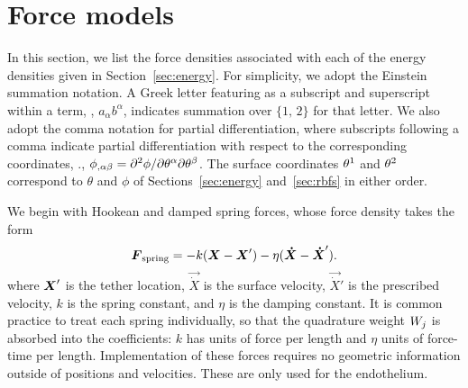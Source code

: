 \section{Force models}\label{sec:forces}
In this section, we list the force densities associated with each of the energy densities
given in Section~\ref{sec:energy}. For simplicity, we adopt the Einstein summation
notation. A Greek letter featuring as a subscript and superscript within a term,
, $a_\alpha b^\alpha$, indicates summation over $\{1,\,2\}$ for that letter.
We also adopt the comma notation for partial differentiation, where subscripts following
a comma indicate partial differentiation with respect to the corresponding coordinates,
., $\phi_{,\alpha\beta} = \partial^2\phi/\partial\q[\alpha]\partial\q[\beta]$.
The surface coordinates $\q[1]$ and $\q[2]$ correspond to $\theta$ and $\phi$ of
Sections~\ref{sec:energy} and~\ref{sec:rbfs} in either order.

We begin with Hookean and damped spring forces, whose force density takes the form
\begin{equation}
    \boldsymbol{F}_\text{spring} = -k (\boldsymbol{X} - \boldsymbol{X}') - \eta(\boldsymbol{\dot{X}}-\boldsymbol{\dot{X}}').
\end{equation}
where $\boldsymbol{X}'$ is the tether location, $\vec{\dot{X}}$ is the surface velocity,
$\vec{\dot{X}}'$ is the prescribed velocity, $k$ is the spring constant, and $\eta$ is
the damping constant. It is common practice to treat each spring individually, so that
the quadrature weight $\weight[j]$ is absorbed into the coefficients: $k$ has units of
force per length and $\eta$ units of force-time per length. Implementation of these
forces requires no geometric information outside of positions and velocities. These 
are only used for the endothelium.

